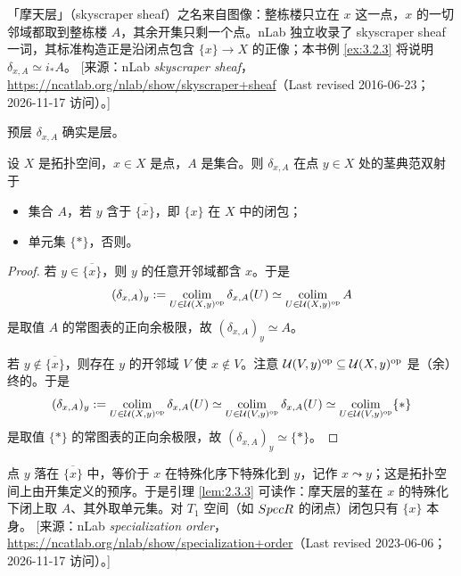\begin{yizhu}
「摩天层」（skyscraper sheaf）之名来自图像：整栋楼只立在 $x$ 这一点，$x$ 的一切邻域都取到整栋楼 $A$，其余开集只剩一个点。nLab 独立收录了 skyscraper sheaf 一词，其标准构造正是沿闭点包含 $\{x\}\to X$ 的正像；本书例 \ref{ex:3.2.3} 将说明 $\delta_{x,A}\simeq i_*A$。
[来源：nLab \emph{skyscraper sheaf}，\url{https://ncatlab.org/nlab/show/skyscraper+sheaf}（Last revised 2016-06-23；2026-11-17 访问）。]
\end{yizhu}

\begin{exercise}\label{exc:2.3.2}
预层 $\delta_{x,A}$ 确实是层。
\end{exercise}

\begin{lemma}\label{lem:2.3.3}
设 $X$ 是拓扑空间，$x\in X$ 是点，$A$ 是集合。则 $\delta_{x,A}$ 在点 $y\in X$ 处的茎典范双射于
\begin{itemize}
  \item 集合 $A$，若 $y$ 含于 $\overline{\{x\}}$，即 $\{x\}$ 在 $X$ 中的闭包；
  \item 单元集 $\{*\}$，否则。
\end{itemize}
\end{lemma}

\begin{proof}
若 $y\in\overline{\{x\}}$，则 $y$ 的任意开邻域都含 $x$。于是
\[
(\delta_{x,A})_y:=\operatorname*{colim}_{U\in\mathcal U(X,y)^{\mathrm{op}}}\delta_{x,A}(U)\simeq\operatorname*{colim}_{U\in\mathcal U(X,y)^{\mathrm{op}}}A
\]
是取值 $A$ 的常图表的正向余极限，故 $(\delta_{x,A})_y\simeq A$。

若 $y\notin\overline{\{x\}}$，则存在 $y$ 的开邻域 $V$ 使 $x\notin V$。注意 $\mathcal U(V,y)^{\mathrm{op}}\subseteq\mathcal U(X,y)^{\mathrm{op}}$ 是（余）终的。于是
\[
(\delta_{x,A})_y:=\operatorname*{colim}_{U\in\mathcal U(X,y)^{\mathrm{op}}}\delta_{x,A}(U)\simeq\operatorname*{colim}_{U\in\mathcal U(V,y)^{\mathrm{op}}}\delta_{x,A}(U)\simeq\operatorname*{colim}_{U\in\mathcal U(V,y)^{\mathrm{op}}}\{*\}
\]
是取值 $\{*\}$ 的常图表的正向余极限，故 $(\delta_{x,A})_y\simeq\{*\}$。
\end{proof}

\begin{yizhu}
点 $y$ 落在 $\overline{\{x\}}$ 中，等价于 $x$ 在特殊化序下特殊化到 $y$，记作 $x\leadsto y$；这是拓扑空间上由开集定义的预序。于是引理 \ref{lem:2.3.3} 可读作：摩天层的茎在 $x$ 的特殊化下闭上取 $A$、其外取单元集。对 $T_1$ 空间（如 $Spec R$ 的闭点）闭包只有 $\{x\}$ 本身。
[来源：nLab \emph{specialization order}，\url{https://ncatlab.org/nlab/show/specialization+order}（Last revised 2023-06-06；2026-11-17 访问）。]
\end{yizhu}

